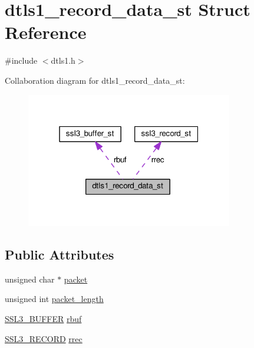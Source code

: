 \hypertarget{structdtls1__record__data__st}{}\section{dtls1\+\_\+record\+\_\+data\+\_\+st Struct Reference}
\label{structdtls1__record__data__st}


{\ttfamily \#include $<$dtls1.\+h$>$}



Collaboration diagram for dtls1\+\_\+record\+\_\+data\+\_\+st\+:
\nopagebreak
\begin{figure}[H]
\begin{center}
\leavevmode
\includegraphics[width=256pt]{structdtls1__record__data__st__coll__graph}
\end{center}
\end{figure}
\subsection*{Public Attributes}
\begin{DoxyCompactItemize}
\item 
unsigned char $\ast$ \hyperlink{structdtls1__record__data__st_af010cf2b401153c4312245f1d62edc95}{packet}
\item 
unsigned int \hyperlink{structdtls1__record__data__st_a37b63c2a75775b814e855a5fc59dca26}{packet\+\_\+length}
\item 
\hyperlink{ssl3_8h_a83f21b8b26819013daff26a110d590a8}{S\+S\+L3\+\_\+\+B\+U\+F\+F\+ER} \hyperlink{structdtls1__record__data__st_ae1bd1518437b259efb71f1a80b612213}{rbuf}
\item 
\hyperlink{ssl3_8h_a79995c4da12258c4a4a1c028e319f7ea}{S\+S\+L3\+\_\+\+R\+E\+C\+O\+RD} \hyperlink{structdtls1__record__data__st_a4b62074b684a63163d87bfbf27bc8453}{rrec}
\end{DoxyCompactItemize}


